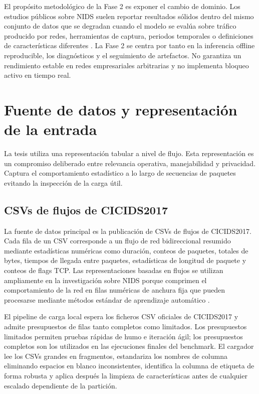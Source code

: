 El propósito metodológico de la Fase 2 es exponer el cambio de dominio. Los estudios públicos sobre NIDS suelen reportar resultados sólidos dentro del mismo conjunto de datos que se degradan cuando el modelo se evalúa sobre tráfico producido por redes, herramientas de captura, periodos temporales o definiciones de características diferentes \parencite{Apruzzese2022CrossEvaluationNIDS,Layeghy2023CrossDomainNIDS}. La Fase 2 se centra por tanto en la inferencia offline reproducible, los diagnósticos y el seguimiento de artefactos. No garantiza un rendimiento estable en redes empresariales arbitrarias y no implementa bloqueo activo en tiempo real.

\section{Fuente de datos y representación de la entrada}
La tesis utiliza una representación tabular a nivel de flujo. Esta representación es un compromiso deliberado entre relevancia operativa, manejabilidad y privacidad. Captura el comportamiento estadístico a lo largo de secuencias de paquetes evitando la inspección de la carga útil.

\subsection{CSVs de flujos de CICIDS2017}
La fuente de datos principal es la publicación de CSVs de flujos de CICIDS2017. Cada fila de un CSV corresponde a un flujo de red bidireccional resumido mediante estadísticas numéricas como duración, conteos de paquetes, totales de bytes, tiempos de llegada entre paquetes, estadísticas de longitud de paquete y conteos de flags TCP. Las representaciones basadas en flujos se utilizan ampliamente en la investigación sobre NIDS porque comprimen el comportamiento de la red en filas numéricas de anchura fija que pueden procesarse mediante métodos estándar de aprendizaje automático \parencite{Sperotto2010FlowIDS,Umer2017FlowIDS}.

El pipeline de carga local espera los ficheros CSV oficiales de CICIDS2017 y admite presupuestos de filas tanto completos como limitados. Los presupuestos limitados permiten pruebas rápidas de humo e iteración ágil; los presupuestos completos son los utilizados en las ejecuciones finales del benchmark. El cargador lee los CSVs grandes en fragmentos, estandariza los nombres de columna eliminando espacios en blanco inconsistentes, identifica la columna de etiqueta de forma robusta y aplica después la limpieza de características antes de cualquier escalado dependiente de la partición.

